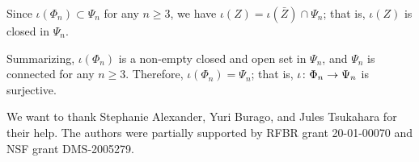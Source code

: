 Since $\iota(\Phi_n)\subset \Psi_n$ for any $n\ge 3$, we have  $\iota (Z)=\iota(\bar Z)\cap \Psi_n$;
that is, $\iota (Z)$ is closed in $\Psi_n$. 

\medskip

Summarizing, $\iota(\Phi_n)$ is a non-empty closed and open set in $\Psi_n$, and $\Psi_n$ is connected for any $n\ge 3$.
Therefore, $\iota(\Phi_n)=\Psi_n$; that is, $\iota\colon\Phi_n\to\Psi_n$ is surjective.
\qeds

 We want to thank Stephanie Alexander, Yuri Burago, and Jules %
Tsukahara for their help. 
The authors were partially supported by RFBR grant 20-01-00070 and NSF grant DMS-2005279.
